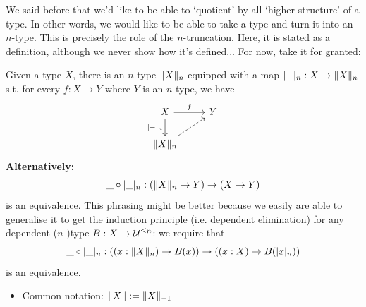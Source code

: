 \documentclass[10pt,oneside,leqno,openright]{memoir}
\begin{document}

We said before that we'd like to be able to `quotient' by all `higher
structure' of a type.
%
In other words, we would like to be able to take a type and turn it into an $n$-type.
%
This is precisely the role of the $n$-truncation.
%
Here, it is stated as a definition, although we never show how it's defined... For now, take it for granted:
\begin{definition}
  Given a type $X$, there is an $n$-type $\lVert X\rVert_n$ equipped with a map $\lvert-\rvert_n: X \to \lVert X\rVert_n$ s.t. for every $f: X \to Y$ where $Y$ is an $n$-type, we have
\[\begin{tikzcd}[ampersand replacement=\&]
	X \& Y \\
	{\Trunc{X}_n}
	\arrow["f", from=1-1, to=1-2]
	\arrow["{\trunc{-}_n}"', from=1-1, to=2-1]
	\arrow[dashed, from=2-1, to=1-2]
\end{tikzcd}\]
\textbf{Alternatively:}
    \[\_\circ\lvert\_\rvert_n : (\lVert X\rVert_n \to Y) \to (X \to Y)\] is an
equivalence.
This phrasing might be better because we easily are able to generalise it to get the induction principle (i.e. dependent elimination) for any dependent ($n$-)type $B : X \to \mathcal{U}^{\le n}$: we require that
\[\_\circ\lvert\_\rvert_n : ((x : \lVert X\rVert_n) \to B(x)) \to ((x:X) \to B(\lvert x\rvert_n))\]
is an equivalence.
\end{definition}
\begin{itemize}
  \item Common notation: $\lVert X\rVert := \lVert X\rVert_{-1}$
\end{itemize}
\end{document}
